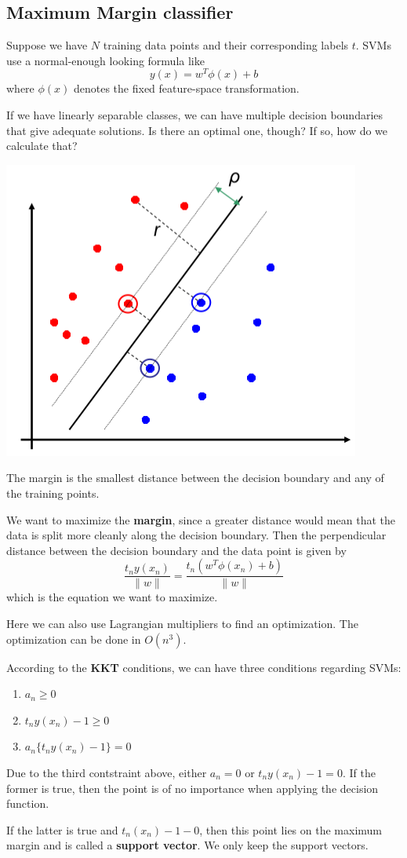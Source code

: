\documentclass{tufte-handout}
\begin{document}
	\subsection{Maximum Margin classifier}
		Suppose we have $N$ training data points and their corresponding labels $t$. SVMs use
		a normal-enough looking formula like 
		\[y(x) = w^{T}\phi(x) + b\]
		where $\phi(x)$ denotes the fixed feature-space transformation.
		
		If we have linearly separable classes, we can have multiple decision boundaries that
		give adequate solutions. Is there an optimal one, though? If so, how do we calculate that?

		\begin{marginfigure}		
			\includegraphics[scale=0.3]{margin}
			\caption{The margin is the smallest distance between the decision boundary and any of
				the training points.}
		\end{marginfigure}	

		We want to maximize the \textbf{margin}, since a greater distance would mean that the data is 
		split more cleanly along the decision boundary. Then the perpendicular distance between the 
		decision boundary and the data point is given by 
		\[ \frac{t_{n}y(x_{n})}{\|w\|} = \frac{t_{n}(w^{T}\phi(x_{n}) + b)}{\|w\|}\]
		which is the equation we want to maximize.
		
		Here we can also use Lagrangian multipliers to find an optimization. The optimization can be done
		in $O(n^{3})$.
		
		According to the \textbf{KKT} conditions, we can have three conditions regarding SVMs:
		\begin{enumerate}
			\item $a_{n} \geq 0$
			\item $t_{n}y(x_{n}) -1 \geq 0$
			\item $a_{n}\{t_{n}y(x_{n})-1\} = 0$
		\end{enumerate}
		Due to the third contstraint above, either $a_{n} = 0$ or $t_{n}y(x_{n}) - 1 = 0$. If the former
		is true, then the point is of no importance when applying the decision function.

		If the latter is true and $t_{n}(x_{n}) - 1 -0$, then this point lies on the maximum margin and 
		is called a \textbf{support vector}. We only keep the support vectors.
\end{document}
